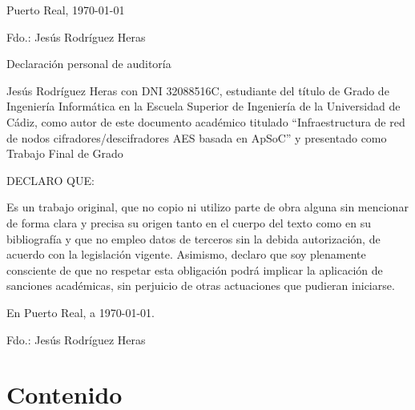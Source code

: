 \documentclass{book}
\begin{document}
{	\bigskip
	\bigskip
	\bigskip
	
	\begin{flushright}
		\large
		Puerto Real, \today
		
		\bigskip    
		\bigskip
		\bigskip
		\bigskip
		\bigskip
		\bigskip
		\bigskip
		\bigskip
		Fdo.: Jesús Rodríguez Heras
		
	\end{flushright}
	
}

\newpage{\pagestyle{empty}\cleardoublepage}  


\begin{center}
	\Large{Declaración personal de auditoría}
\end{center}
Jesús Rodríguez Heras con DNI 32088516C, estudiante del título de Grado de Ingeniería Informática en la Escuela Superior de Ingeniería de la Universidad de Cádiz, como autor de este documento académico titulado ``Infraestructura de red de nodos cifradores/descifradores AES basada en ApSoC'' y presentado como Trabajo Final de Grado

DECLARO QUE:

Es un trabajo original, que no copio ni utilizo parte de obra alguna sin mencionar de forma
clara y precisa su origen tanto en el cuerpo del texto como en su bibliografía y que no empleo datos de terceros sin la debida autorización, de acuerdo con la legislación vigente. Asimismo, declaro que soy plenamente consciente de que no respetar esta obligación podrá implicar la aplicación de sanciones académicas, sin perjuicio de otras actuaciones que pudieran iniciarse.

En Puerto Real, a \today.

\bigskip
\bigskip
\bigskip
\bigskip
\bigskip
Fdo.: Jesús Rodríguez Heras
	
	\newpage{\pagestyle{empty}\cleardoublepage}  
	
%	

	
	\newpage{\pagestyle{empty}\cleardoublepage}  
	
	\newpage{\pagestyle{empty}\cleardoublepage}  
	
	
	\tableofcontents
	\newpage
	\listoffigures
	\newpage
	\listoftables
	\newpage
	
	\part{Contenido}
\end{document}
